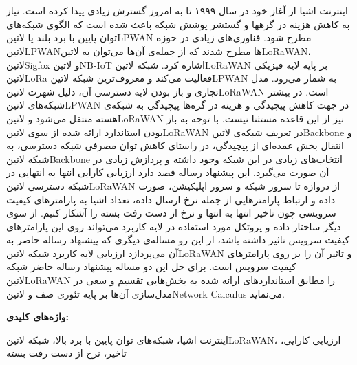 \newpage\clearpage

\pagestyle{abstract}

\vspace*{-1cm}
\section*{\centering \abstractname}
\vspace*{.5cm}

اینترنت اشیا از آغاز خود در سال ۱۹۹۹ تا به امروز گسترش زیادی پیدا کرده است.
نیاز به کاهش هزینه در گرهها و گستشر پوشش شبکه باعث شده است که الگوی
شبکه‌های توان پایین با برد بلند یا
‌لاتین{LPWAN} مطرح شود.
فناوری‌های زیادی در حوزه ‌لاتین{LPWAN}ها مطرح شدند که از جمله‌ی آن‌ها می‌توان به ‌لاتین{LoRaWAN}، ‌لاتین{Sigfox} و ‌لاتین{NB-IoT}
اشاره کرد. شبکه ‌لاتین{LoRaWAN} بر پایه لایه فیزیکی ‌لاتین{LoRa} فعالیت می‌کند و
معروف‌ترین شبکه ‌لاتین{LPWAN} به شمار می‌رود. مدل تجاری و باز بودن
لایه دسترسی آن، دلیل شهرت ‌لاتین{LoRaWAN} است.
در بیشتر شبکه‌های ‌لاتین{LPWAN} در جهت کاهش پیچیدگی و هزینه در گره‌ها پیچیدگی به شبکه‌ی هسته منتقل می‌شود و ‌لاتین{LoRaWAN}
نیز از این قاعده مستثنا نیست.
با توجه به باز بودن استاندارد ارائه شده از سوی ‌لاتین{LoRaWAN} در تعریف شبکه‌ی ‌لاتین{Backbone} و
انتقال بخش عمده‌ای از پیچیدگی، در راستای کاهش توان مصرفی
شبکه دسترسی، به شبکه ‌لاتین{Backbone} انتخاب‌های زیادی در این شبکه وجود داشته و پردازش زیادی در آن صورت می‌گیرد.
این پیشنهاد رساله قصد دارد ارزیابی کارایی انتها به انتهایی در شبکه دسترسی ‌لاتین{LoRaWAN}
از دروازه تا سرور شبکه و سرور اپلیکیشن،
صورت داده و ارتباط پارامترهایی از جمله نرخ ارسال داده، تعداد اشیا
به پارامترهای کیفیت سرویسی چون تاخیر انتها به انتها و نرخ از دست رفت بسته را آشکار کنیم.
از سوی دیگر ساختار داده و پروتکل مورد استفاده در لایه کاربرد می‌تواند روی این پارامترهای کیفیت سرویس تاثیر داشته باشد،
از این رو مساله‌ی دیگری که پیشنهاد رساله حاضر به آن می‌پردازد
ارزیابی لایه کاربرد شبکه ‌لاتین{LoRaWAN}
و تاثیر آن را بر روی پارامترهای کیفیت سرویس است.
برای حل این دو مساله پیشنهاد رساله حاضر شبکه ‌لاتین{LoRaWAN} را
مطابق استانداردهای ارائه شده
به بخش‌هایی تقسیم و سعی در مدل‌سازی آن‌ها بر پایه تئوری صف و ‌لاتین{Network Calculus}
می‌نماید.

\vspace*{2cm}

{%
  \noindent\large\textbf{واژه‌های کلیدی:}
}\par
\vspace*{.5cm}
اینترنت اشیا، شبکه‌های توان پایین با برد بالا، شبکه ‌لاتین{LoRaWAN}، ارزیابی کارایی، تاخیر، نرخ از دست رفت بسته
